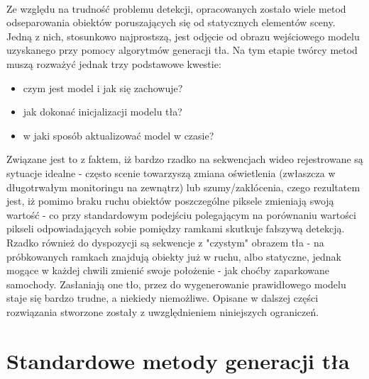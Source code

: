 \paragraph{}
Ze względu na trudność problemu detekcji, opracowanych zostało wiele metod odseparowania obiektów poruszających się od statycznych elementów sceny. Jedną z nich, stosunkowo najprostszą, jest odjęcie od obrazu wejściowego modelu uzyskanego przy pomocy algorytmów generacji tła. Na tym etapie twórcy metod muszą rozważyć jednak trzy podstawowe kwestie:
\begin{itemize}
\item czym jest model i jak się zachowuje?
\item jak dokonać inicjalizacji modelu tła?
\item w jaki sposób aktualizować model w czasie?
\end{itemize}
Związane jest to z faktem, iż bardzo rzadko na sekwencjach wideo rejestrowane są sytuacje idealne - często scenie towarzyszą zmiana oświetlenia (zwłaszcza w długotrwałym monitoringu na zewnątrz) lub szumy/zakłócenia, czego rezultatem jest, iż pomimo braku ruchu obiektów poszczególne piksele zmieniają swoją wartość - co przy standardowym podejściu polegającym na porównaniu wartości pikseli odpowiadających sobie pomiędzy ramkami skutkuje fałszywą detekcją. Rzadko również do dyspozycji są sekwencje z "czystym" obrazem tła - na próbkowanych ramkach znajdują obiekty już w ruchu, albo statyczne, jednak mogące w każdej chwili zmienić swoje położenie - jak choćby zaparkowane samochody. Zasłaniają one tło, przez do wygenerowanie prawidłowego modelu staje się bardzo trudne, a niekiedy niemożliwe. Opisane w dalszej części rozwiązania stworzone zostały z uwzględnieniem niniejszych ograniczeń.
\section{Standardowe metody generacji tła}
